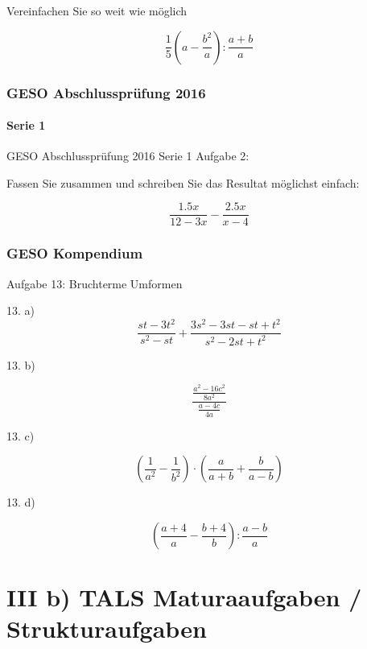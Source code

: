 Vereinfachen Sie so weit wie möglich

$$\frac15\left( a - \frac{b^2}{a} \right) : \frac{a+b}{a}$$


\section*{GESO Abschlussprüfung 2016}
\subsection*{Serie 1}
GESO Abschlussprüfung 2016 Serie 1 Aufgabe 2:

Fassen Sie zusammen und schreiben Sie das Resultat möglichst einfach:

$$\frac{1.5x}{12-3x} - \frac{2.5x}{x-4}$$

\newpage
\section*{GESO Kompendium}

Aufgabe 13: Bruchterme Umformen

13. a)
$$\frac{st-3t^2}{s^2-st} + \frac{3s^2-3st-st+t^2}{s^2-2st+t^2}$$


13. b)

$$\frac{\frac{a^2-16c^2}{8a^2}}{\frac{a-4c}{4a}}$$


13. c)

$$\left(\frac1{a^2} - \frac1{b^2} \right) \cdot{} \left( \frac{a}{a+b} + \frac{b}{a-b}\right)$$


13. d)

$$\left(\frac{a+4}a - \frac{b+4}b \right) : \frac{a-b}a$$



\newpage
\part*{III b) TALS Maturaaufgaben / Strukturaufgaben}

